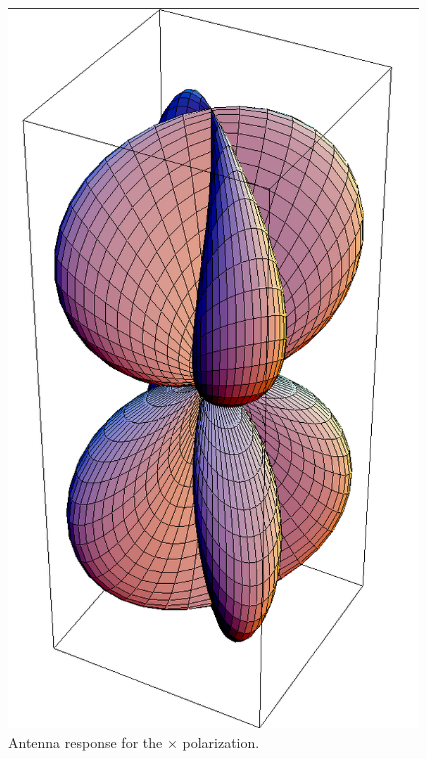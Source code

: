 \begin{figure}[!h]
\centerline{\includegraphics[angle=0,height=7.5in]{Figures/AppI/Peanut-cross.png}}
\caption[Peanut (cross)]{Antenna response for the $\times$ polarization.}
\label{eq:Peanut-cross}
\end{figure}

